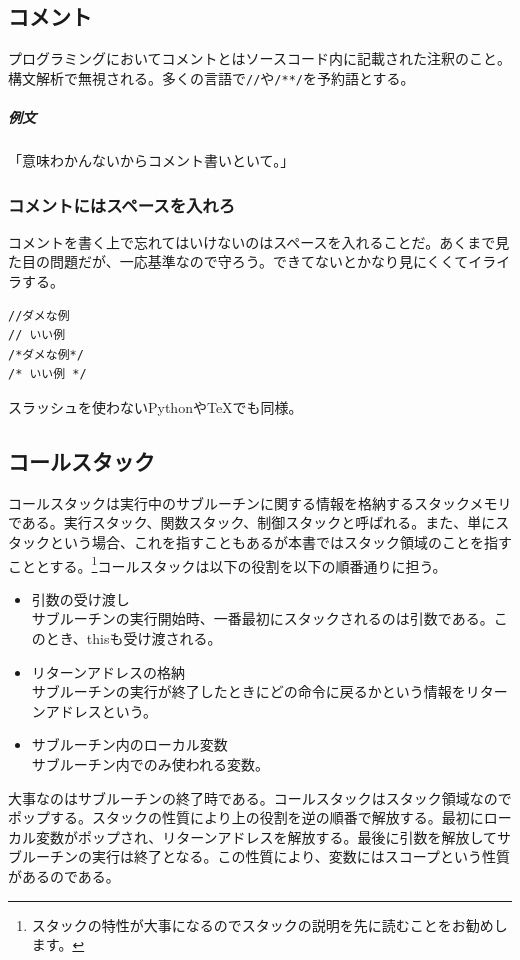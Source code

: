\documentclass[a4paper]{ltjsreport}
\newcommand{\terlogy}[2][|]{\colorbox{terlogy}{\texttt{\lstinline#1#2#1}}}
\begin{document}
\subsection{コメント}
プログラミングにおいてコメントとはソースコード内に記載された注釈のこと。構文解析で無視される。多くの言語で\terlogy{//}や\terlogy{/**/}を予約語とする。

\subparagraph{例文} 「意味わかんないからコメント書いといて。」

\subsubsection{コメントにはスペースを入れろ}
コメントを書く上で忘れてはいけないのはスペースを入れることだ。あくまで見た目の問題だが、一応基準なので守ろう。できてないとかなり見にくくてイライラする。

\lstset{language=Java}
\begin{lstlisting}
//ダメな例
// いい例
/*ダメな例*/
/* いい例 */
\end{lstlisting}
スラッシュを使わないPythonや\TeX でも同様。

\subsection{コールスタック}
コールスタックは実行中のサブルーチンに関する情報を格納するスタックメモリである。実行スタック、関数スタック、制御スタックと呼ばれる。また、単にスタックという場合、これを指すこともあるが本書ではスタック領域のことを指すこととする。\footnote{スタックの特性が大事になるのでスタックの説明を先に読むことをお勧めします。}コールスタックは以下の役割を以下の順番通りに担う。
\begin{itemize}
  \item 引数の受け渡し\\
        サブルーチンの実行開始時、一番最初にスタックされるのは引数である。このとき、thisも受け渡される。
  \item リターンアドレスの格納\\
        サブルーチンの実行が終了したときにどの命令に戻るかという情報をリターンアドレスという。
  \item サブルーチン内のローカル変数\\
        サブルーチン内でのみ使われる変数。
\end{itemize}

大事なのはサブルーチンの終了時である。コールスタックはスタック領域なのでポップする。スタックの性質により上の役割を逆の順番で解放する。最初にローカル変数がポップされ、リターンアドレスを解放する。最後に引数を解放してサブルーチンの実行は終了となる。この性質により、変数にはスコープという性質があるのである。
\end{document}
